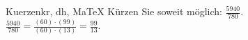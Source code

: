 \begin{MAufgabe}{Kuerzen}{kr, dh, MaTeX}
K\"urzen Sie soweit m\"oglich: $\frac{5940}{780}$.\\ 
\ifLsg\MLoesung
\quad $\frac{5940}{780}=\frac{(60)\cdot(99)}{(60)\cdot(13)}=\frac{99}{13}$.\else\relax\fi
 \end{MAufgabe}